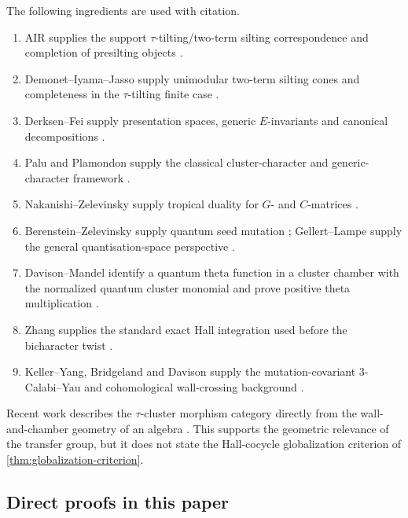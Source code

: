 The following ingredients are used with citation.
\begin{enumerate}[label=(\roman*),leftmargin=2.4em]
\item AIR supplies the support $\tau$-tilting/two-term silting
      correspondence and completion of presilting objects \cite{AIR}.
\item Demonet--Iyama--Jasso supply unimodular two-term silting cones and
      completeness in the $\tau$-tilting finite case \cite{DIJ}.
\item Derksen--Fei supply presentation spaces, generic $E$-invariants and
      canonical decompositions \cite{DerksenFei}.
\item Palu and Plamondon supply the classical cluster-character and generic-
      character framework \cite{Palu,PlamondonGeneric}.
\item Nakanishi--Zelevinsky supply tropical duality for $G$- and $C$-matrices
      \cite{NakanishiZelevinsky}.
\item Berenstein--Zelevinsky supply quantum seed mutation
      \cite{BZ}; Gellert--Lampe supply the general quantisation-space
      perspective \cite{GellertLampe}.
\item Davison--Mandel identify a quantum theta function in a cluster chamber
      with the normalized quantum cluster monomial and prove positive theta
      multiplication \cite{DavisonMandel}.
\item Zhang supplies the standard exact Hall integration used before the
      bicharacter twist \cite{ZhangFixedSize}.
\item Keller--Yang, Bridgeland and Davison supply the mutation-covariant
      $3$-Calabi--Yau and cohomological wall-crossing background
      \cite{KellerYang,BridgelandScattering,Davison}.
\end{enumerate}

Recent work describes the $\tau$-cluster morphism category directly from the
wall-and-chamber geometry of an algebra
\cite{SchrollTattarTreffingerWilliams}.  This supports the geometric relevance
of the transfer group, but it does not state the Hall-cocycle globalization
criterion of \cref{thm:globalization-criterion}.

\subsection{Direct proofs in this paper}

